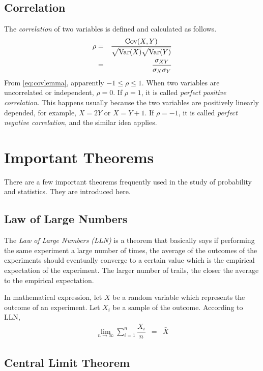 \subsection{Correlation}

The \textit{correlation} of two variables is defined and calculated as follows.
\begin{eqnarray}
  \rho &=& \dfrac{\textup{Cov}(X, Y)}{\sqrt{\textup{Var}(X)}\sqrt{\textup{Var}(Y)}} \nonumber \\
   &=& \dfrac{\sigma_{XY}}{\sigma_X\sigma_Y} \nonumber
\end{eqnarray}
From \eqref{eq:covlemma}, apparently $-1\leq \rho \leq 1$. When two variables are uncorrelated or independent, $\rho=0$. If $\rho=1$, it is called \textit{perfect positive correlation}. This happens usually because the two variables are positively linearly depended, for example, $X=2Y$ or $X=Y+1$. If $\rho=-1$, it is called \textit{perfect negative correlation}, and the similar idea applies.

\section{Important Theorems}

There are a few important theorems frequently used in the study of probability and statistics. They are introduced here.

\subsection{Law of Large Numbers}

The \textit{Law of Large Numbers (LLN)} is a theorem that basically says if performing the same experiment a large number of times, the average of the outcomes of the experiments should eventually converge to a certain value which is the empirical expectation of the experiment. The larger number of trails, the closer the average to the empirical expectation.

In mathematical expression, let $X$ be a random variable which represents the outcome of an experiment. Let $X_i$ be a sample of the outcome. According to LLN,
\begin{eqnarray}
  \lim_{n\rightarrow\infty} \sum_{i=1}^{n}\dfrac{X_i}{n} &=& \bar{X} \nonumber
\end{eqnarray}

\subsection{Central Limit Theorem}

